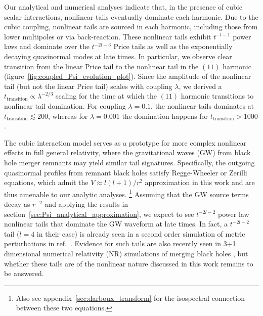 \documentclass[reprint,aps,physrev,superscriptaddress,10pt,notitlepage,prd,nofootinbib,onecolumn]{revtex4-2}
\newcommand{\fref}[1]{figure~\ref{#1}}
\newcommand{\sref}[1]{section~\ref{#1}}
\newcommand{\aref}[1]{appendix~\ref{#1}}
\begin{document}
Our analytical and numerical analyses indicate that, in the presence of cubic scalar interactions, nonlinear tails eventually dominate each harmonic.
Due to the cubic coupling, nonlinear tails are sourced in each harmonic, including those from lower multipoles or via back-reaction.
These nonlinear tails exhibit $t^{-l-1}$ power laws and dominate over the $t^{-2l-3}$ Price tails as well as the exponentially decaying quasinormal modes at late times.
In particular, we observe clear transition from the linear Price tail to the nonlinear tail in the $(11)$ harmonic (\fref{fig:coupled_Psi_evolution_plot}).
Since the amplitude of the nonlinear tail (but not the linear Price tail) scales with coupling $\lambda$, we derived a $t_{\mathrm{transition}} \propto \lambda^{-2/3}$ scaling for the time at which the $(11)$ harmonic transitions to nonlinear tail domination.
For coupling $\lambda = 0.1$, the nonlinear tails dominates at $t_{\mathrm{transition}} \lesssim 200$, whereas for $\lambda = 0.001$ the domination happens for $t_{\mathrm{transition}} > 1000$.


The cubic interaction model serves as a prototype for more complex nonlinear effects in full general relativity, where the gravitational waves (GW) from black hole merger remnants may yield similar tail signatures.
Specifically, the outgoing quasinormal profiles from remnant black holes satisfy Regge-Wheeler or Zerilli equations, which admit the $V \approx l(l+1)/r^2$ approximation in this work and are thus amenable to our analytic analyses.
\footnote{Also see \aref{sec:darboux_transform} for the isospectral connection between these two equations.}
Assuming that the GW source terms decay as $r^{-2}$ and applying the results in \sref{sec:Psi_analytical_approximation}, we expect to see $t^{-2l-2}$ power law nonlinear tails that dominate the GW waveform at late times.
In fact, a $t^{-2l-2}$ tail ($l=4$ in their case) is already seen in a second order simulation of metric perturbations in ref.~\cite{Cardoso:2024jme}.
Evidence for such tails are also recently seen in 3+1 dimensional numerical relativity (NR) simulations of merging black holes \cite{DeAmicis:2024eoy,Ma:2024hzq}, but whether these tails are of the nonlinear nature discussed in this work remains to be answered.
\end{document}

